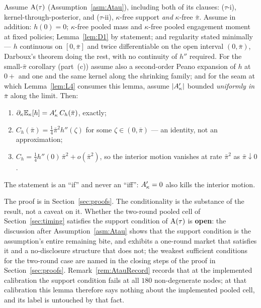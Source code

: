 \begin{lemma}
\label{lem:L3}
Assume $\mathrm{A}(\tau)$ (Assumption~\ref{asm:Atau}), including both of its clauses: ($\tau$-i),
kernel-through-posterior, and ($\tau$-ii), $\kappa$-free support \emph{and} $\kappa$-free $\bar\pi$.
Assume in addition: $h(0) = 0$; $\kappa$-free pooled mass and $\kappa$-free pooled engagement moment
at fixed policies; Lemma~\ref{lem:D1} by statement; and regularity stated minimally --- $h$
continuous on $[0,\bar\pi]$ and twice differentiable on the open interval $(0,\bar\pi)$, Darboux's
theorem doing the rest, with no continuity of $h''$ required. For the small-$\bar\pi$ corollary
(part~(c)) assume also a second-order Peano expansion of $h$ at $0+$ and one and the same kernel
along the shrinking family; and for the seam at which Lemma~\ref{lem:L4} consumes this lemma, assume
$|A'_{\kappa}|$ bounded \emph{uniformly in $\bar\pi$} along the limit. Then:
\begin{enumerate}[label=(\alph*),leftmargin=2.4em,itemsep=3pt]
\item $\partial_\kappa \mathbb{E}_\kappa[h] = A'_{\kappa}\,C_h(\bar\pi)$, exactly;
\item $C_h(\bar\pi) = \tfrac14\bar\pi^2 h''(\zeta)$ for some $\zeta \in (0,\bar\pi)$ --- an identity,
  not an approximation;
\item $C_h = \tfrac14 h''(0)\,\bar\pi^2 + o(\bar\pi^2)$, so the interior motion vanishes at rate
  $\bar\pi^2$ as $\bar\pi \downarrow 0$.
\end{enumerate}
The statement is an ``if'' and never an ``iff'': $A'_{\kappa} = 0$ also kills the interior motion.
\end{lemma}

The proof is in Section~\ref{sec:proofs}. The conditionality is the substance of the result, not a
caveat on it. Whether the two-round pooled cell of Section~\ref{sec:timing} satisfies the support
condition of $\mathrm{A}(\tau)$ is \textbf{open}: the discussion after Assumption~\ref{asm:Atau} shows that the
support condition is the assumption's entire remaining bite, and exhibits a one-round market that
satisfies it and a no-disclosure structure that does not; the weakest sufficient conditions for the
two-round case are named in the closing steps of the proof in
Section~\ref{sec:proofs}. Remark~\ref{rem:AtauRecord} records that at the implemented calibration the
support condition fails at all $180$ non-degenerate nodes; at that calibration this lemma therefore
says nothing about the implemented pooled cell, and its label is untouched by that fact.


